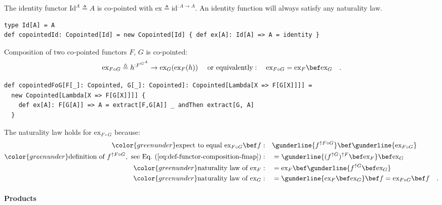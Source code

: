 The identity functor $\text{Id}^{A}\triangleq A$ is co-pointed with
$\text{ex}\triangleq\text{id}^{:A\rightarrow A}$. An identity function
will always satisfy any naturality law.
\begin{lstlisting}
type Id[A] = A
def copointedId: Copointed[Id] = new Copointed[Id] { def ex[A]: Id[A] => A = identity }
\end{lstlisting}

Composition of two co-pointed functors $F$, $G$ is co-pointed:
\[
\text{ex}_{F\circ G}\triangleq h^{:F^{G^{A}}}\rightarrow\text{ex}_{G}(\text{ex}_{F}(h))\quad\text{ or equivalently}:\quad\text{ex}_{F\circ G}=\text{ex}_{F}\bef\text{ex}_{G}\quad.
\]
\begin{lstlisting}
def copointedFoG[F[_]: Copointed, G[_]: Copointed]: Copointed[Lambda[X => F[G[X]]]] =     
  new Copointed[Lambda[X => F[G[X]]]] {
    def ex[A]: F[G[A]] => A = extract[F,G[A]] _ andThen extract[G, A]
  }
\end{lstlisting}
The naturality law holds for $\text{ex}_{F\circ G}$ because:
\begin{align*}
{\color{greenunder}\text{expect to equal }\text{ex}_{F\circ G}\bef f:}\quad & \gunderline{f^{\uparrow F\circ G}}\bef\gunderline{\text{ex}_{F\circ G}}\\
{\color{greenunder}\text{definition of }\ensuremath{f^{\uparrow F\circ G}},\text{ see Eq.~(\ref{eq:def-functor-composition-fmap})}:}\quad & =\gunderline{(f^{\uparrow G})^{\uparrow F}\bef\text{ex}_{F}}\bef\text{ex}_{G}\\
{\color{greenunder}\text{naturality law of }\text{ex}_{F}:}\quad & =\text{ex}_{F}\bef\gunderline{f^{\uparrow G}\bef\text{ex}_{G}}\\
{\color{greenunder}\text{naturality law of }\text{ex}_{G}:}\quad & =\gunderline{\text{ex}_{F}\bef\text{ex}_{G}}\bef f=\text{ex}_{F\circ G}\bef f\quad.
\end{align*}


\paragraph{Products}

